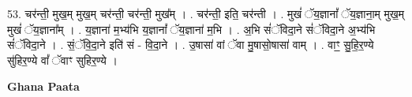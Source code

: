 \documentclass[17pt]{extarticle}
\begin{document}
53. चर॑न्ती॒ मुख॒म् मुख॒म् चर॑न्ती॒ चर॑न्ती॒ मुख᳚म् । . चर॑न्ती॒ इति॒ चर॑न्ती । . मुखं॑ ॅय॒ज्ञानां᳚ ॅय॒ज्ञाना॒म् मुख॒म् मुखं॑ ॅय॒ज्ञाना᳚म् । . य॒ज्ञाना॑ म॒भ्य॑भि य॒ज्ञानां᳚ ॅय॒ज्ञाना॑ म॒भि । . अ॒भि सं॑ॅविदा॒ने सं॑ॅविदा॒ने अ॒भ्य॑भि सं॑ॅविदा॒ने । . सं॒ॅवि॒दा॒ने इति॑ सं - वि॒दा॒ने । . उ॒षासा॑ वां ॅवा मु॒षासो॒षासा॑ वाम् । . वाꣳ॒॒ सु॒हि॒र॒ण्ये सु॑हिर॒ण्ये वां᳚ ॅवाꣳ सुहिर॒ण्ये । \newline

\textbf{Ghana Paata } \newline
\end{document}
